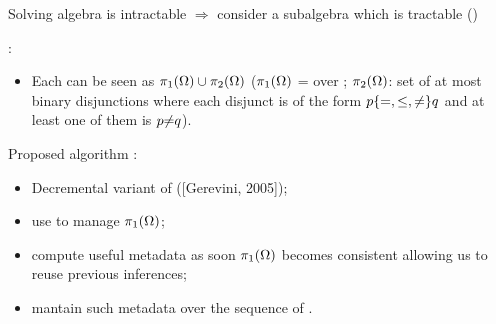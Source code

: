 \begin{frame}{Solving \DOHSATProblemName{}}
    \IAName{} algebra is intractable $\Rightarrow$ consider a subalgebra which is tractable (\OrdHornName{})

    \DOHSATProblemName{}:
    \begin{itemize}
        \item Each \TCSPName{} \IACSP{} can be seen as $\piOne{\IACSP{}} \cup \piTwo{\IACSP{}}$ ($\piOne{\IACSP{}}$ = \TCSPName{} over \PAName{}; $\piTwo{\IACSP{}}$: set of at most binary disjunctions where each disjunct is of the form $p \{=, \leq, \noteq{} \} q$ and at least one of them is $p \noteq{} q$).
    \end{itemize}

    Proposed algorithm \DOHSATAlgorithmName{}:
    \begin{itemize}
        \item Decremental variant of \OHSATAlgorithmName{} ([Gerevini, 2005]);
        \item use \DPASATAlgorithmName{} to manage $\piOne{\IACSP{}}$;
        \item compute useful metadata as soon $\piOne{\IACSP{}}$ becomes consistent allowing us to reuse previous \OHSATAlgorithmName{} inferences;
        \item mantain such metadata over the sequence of \TCSPNames{}.
    \end{itemize}
\end{frame}

